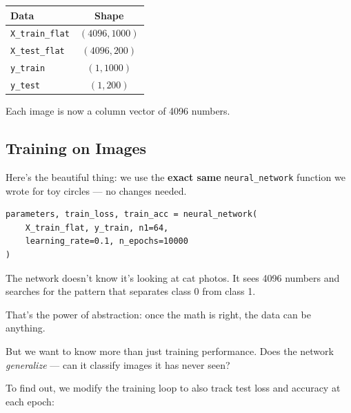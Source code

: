\documentclass[11pt]{article}
\begin{document}
\begin{center}
\begin{tabular}{l c}
\textbf{Data} & \textbf{Shape} \\
\hline
\texttt{X\_train\_flat} & $(4096, 1000)$ \\
\texttt{X\_test\_flat} & $(4096, 200)$ \\
\texttt{y\_train} & $(1, 1000)$ \\
\texttt{y\_test} & $(1, 200)$ \\
\end{tabular}
\end{center}

Each image is now a column vector of 4096 numbers.

\subsection{Training on Images}

Here's the beautiful thing: we use the \textbf{exact same} \texttt{neural\_network} function we wrote for toy circles --- no changes needed.

\begin{lstlisting}
parameters, train_loss, train_acc = neural_network(
    X_train_flat, y_train, n1=64,
    learning_rate=0.1, n_epochs=10000
)
\end{lstlisting}

\begin{insightbox}[title={Same Code, Different World}]
The network doesn't know it's looking at cat photos. It sees
4096 numbers and searches for the pattern that separates class 0 from class 1.

That's the power of abstraction: once the math is right, the data can be anything.
\end{insightbox}

But we want to know more than just training performance.
Does the network \emph{generalize} --- can it classify images it has never seen?

To find out, we modify the training loop to also track test loss and accuracy at each epoch:
\end{document}
